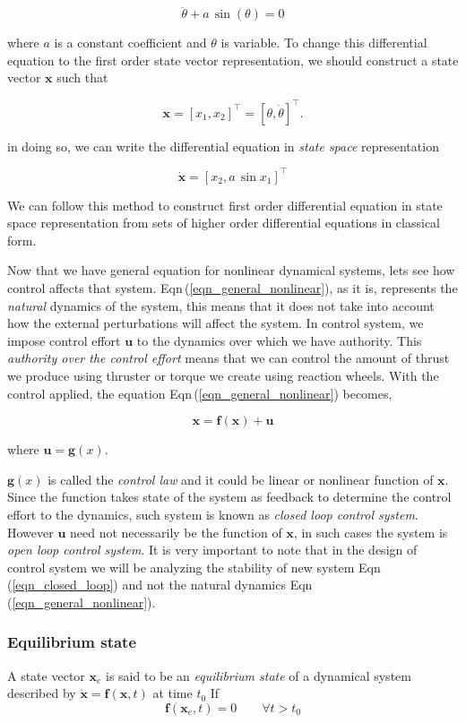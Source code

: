 \documentclass{article}
\begin{document}
$$
\ddot{\theta} + a\,\sin(\theta) = 0
$$

where $a$ is a constant coefficient and $\theta$ is variable. To change this differential equation to the first order state vector representation, we should construct a state vector $\bm{x}$ such that

$$
\bm{x} = [x_{1}, x_{2}]^\intercal = [\theta, \dot{\theta}]^\intercal.
$$

in doing so, we can write the differential equation in \textit{state space} representation

$$
\dot{\bm{x}} = [x_{2}, a\,\sin{x_{1}}]^\intercal
$$

We can follow this method to construct first order differential equation in state space representation from sets of higher order differential equations in classical form.

Now that we have general equation for nonlinear dynamical systems, lets see how control affects that system. Eqn\,(\ref{eqn_general_nonlinear}), as it is, represents the \textit{natural} dynamics of the system, this means that it does not take into account how the external perturbations will affect the system. In control system, we impose control effort $\bm{u}$ to the dynamics over which we have authority. This \textit{authority over the control effort} means that we can control the amount of thrust we produce using thruster or torque we create using reaction wheels. With the control applied, the equation Eqn\,(\ref{eqn_general_nonlinear}) becomes,

\begin{equation}
\label{eqn_closed_loop}
\bm{x}=\bm{f}(\bm{x})+\bm{u}
\end{equation}

where $\bm{u} = \bm{g}(x)$. 

$\bm{g}(x)$ is called the \textit{control law} and it could be linear or nonlinear function of $\bm{x}$. Since the function takes state of the system as feedback to determine the control effort to the dynamics, such system is known as \textit{closed loop control system}. However $\bm{u}$ need not necessarily be the function of $\bm{x}$, in such cases the system is \textit{open loop control system}. It is very important to note that in the design of control system we will be analyzing the stability of new system Eqn\,(\ref{eqn_closed_loop}) and not the natural dynamics Eqn\,(\ref{eqn_general_nonlinear}).

\subsubsection*{Equilibrium state}
A state vector $\bm{x}_{e}$ is said to be an \textit{equilibrium state} of a dynamical system described by $\dot{\bm{x}} = \bm{f}(\bm{x}, t)$ at time $t_{0}$ If
$$
\bm{f}(\bm{x}_{e},t) = 0\quad\quad \forall t > t_{0}
$$
\end{document}
